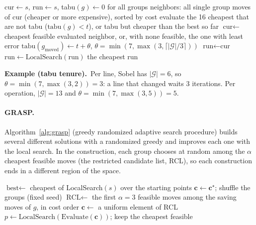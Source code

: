 \documentclass[11pt,a4paper]{article}
\newcommand{\examplebox}[2]{\par\medskip\noindent\colorbox{tabAzul!6}{\begin{minipage}{\dimexpr\linewidth-2\fboxsep}
  \textbf{Example (#1).}\ #2\end{minipage}}\par\medskip}
\begin{document}
\begin{algorithm}[H]
\caption{Tabu search}\label{alg:tabu}
\begin{algorithmic}[1]
  \State $\text{cur} \gets s$, $\text{run} \gets s$, tabu$(g) \gets 0$ for all groups
    \State neighbors: all single group moves of $\text{cur}$ (cheaper or more expensive), sorted by cost
    \State evaluate the 16 cheapest that are not tabu ($\text{tabu}(g) < t$), or tabu but cheaper than the best so far
    \State $\text{cur} \gets$ cheapest feasible evaluated neighbor, or, with none feasible, the one with least error
    \State $\text{tabu}(g_{\text{moved}}) \gets t + \theta$, \; $\theta = \min(7, \max(3, \lceil |\mathcal{G}|/3 \rceil))$
     $\text{run} \gets \text{cur}$
    \EndIf
  \EndFor
  \State $\text{run} \gets \text{LocalSearch}(\text{run})$
\EndFor
\State \Return the cheapest $\text{run}$
\end{algorithmic}
\end{algorithm}

\examplebox{tabu tenure}{Per line, Sobel has $|\mathcal{G}| = 6$, so $\theta = \min(7, \max(3, 2)) = 3$: a line that
changed waits 3 iterations. Per operation, $|\mathcal{G}| = 13$ and $\theta = \min(7, \max(3, 5)) = 5$.}

\paragraph{GRASP.} Algorithm~\ref{alg:grasp} (greedy randomized adaptive search procedure) builds several different
solutions with a randomized greedy and improves each one with the local search. In the construction, each group
chooses at random among the $\alpha$ cheapest feasible moves (the restricted candidate list, RCL), so each
construction ends in a different region of the space.

\begin{algorithm}[H]
\caption{GRASP}\label{alg:grasp}
\begin{algorithmic}[1]
\State $\text{best} \gets$ cheapest of LocalSearch$(s)$ over the starting points
  \State $\mathbf{c} \gets \mathbf{c}^\star$; shuffle the groups (fixed seed)
    \State $\text{RCL} \gets$ the first $\alpha = 3$ feasible moves among the saving moves of $g$, in cost order
     $\mathbf{c} \gets$ a uniform element of RCL
    \EndIf
  \EndFor
  \State $p \gets \text{LocalSearch}(\text{Evaluate}(\mathbf{c}))$; keep the cheapest feasible
\EndFor
\end{algorithmic}
\end{algorithm}
\end{document}
